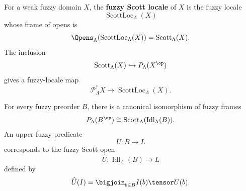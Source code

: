 \begin{definition}
\label{def:fuzzy-scott-locale-posetal}
For a weak fuzzy domain \(X\), the \textbf{fuzzy Scott locale} of \(X\) is the
fuzzy locale
\[
    \operatorname{ScottLoc}_\Lambda(X)
\]
whose frame of opens is
\[
    \Opens_\Lambda(\operatorname{ScottLoc}_\Lambda(X))
    =
    \operatorname{Scott}_\Lambda(X).
\]
The inclusion
\[
    \operatorname{Scott}_\Lambda(X)\hookrightarrow P_\Lambda(X^{\op})
\]
gives a fuzzy-locale map
\[
    \mathcal P_\Lambda^\uparrow X
    \longrightarrow
    \operatorname{ScottLoc}_\Lambda(X).
\]
\end{definition}

\begin{theorem}
\label{thm:scott-opens-free-fuzzy-domain}
For every fuzzy preorder \(B\), there is a canonical isomorphism of fuzzy frames
\[
    P_\Lambda(B^{\op})
    \cong
    \operatorname{Scott}_\Lambda(\operatorname{Idl}_\Lambda(B)).
\]
An upper fuzzy predicate
\[
    U:B\to L
\]
corresponds to the fuzzy Scott open
\[
    \widehat U:\operatorname{Idl}_\Lambda(B)\to L
\]
defined by
\[
    \widehat U(I)
    =
    \bigjoin_{b\in B}I(b)\tensor U(b).
\]
\end{theorem}

